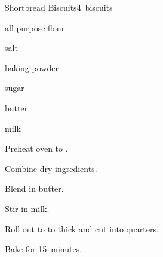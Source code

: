 \begin{recipe}{Shortbread Biscuits\UNTESTED}{}{4~biscuits}

\begin{ingredients}
\item {} all-purpose flour
\item \tp{\half} salt
\item {} baking powder
\item {} sugar
\item {} butter
\item \C{\half} milk
\end{ingredients}

\begin{directions}
\item Preheat oven to .
\item Combine dry ingredients.
\item Blend in butter.
\item Stir in milk.
\item Roll out to to  thick and cut into quarters.
\item Bake for 15~minutes.
\end{directions}
\end{recipe}
